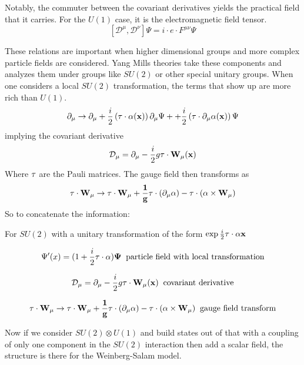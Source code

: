 Notably, the commuter between the covariant derivatives yields the practical field that it carries. For the $U(1) $ case, it is the electromagnetic field tensor. 
\[  \left[ \mathcal{D}^\mu,\mathcal{D}^\nu\right] \Psi = i\cdot e\cdot F^{\mu\nu} \Psi\]

These relations are important when higher dimensional groups and more complex particle fields are considered. Yang Mills theories take these components and analyzes them under groups like $SU(2)$ or other special unitary groups. When one considers a local $SU(2)$ transformation, the terms that show up are more rich than $U(1)$.  
\[\partial_\mu \rightarrow \partial_\mu +\frac{i}{2}\left(\bf{\tau}\cdot\bf{\alpha}(x)\right)\partial_\mu \Psi +  +\frac{i}{2}\left(\bf{\tau}\cdot\partial_\mu\bf{\alpha}(x)\right) \Psi  \]
implying the covariant derivative 
\[\mathcal{D}_\mu = \partial_\mu -\frac{i}{2} g \bf{\tau}\cdot \bf{W}_\mu(x)\]
Where $\bf{\tau}$ are the Pauli matrices.
The gauge field then transforms as 
\[\bf{\tau}\cdot\bf{W}_\mu \rightarrow  \bf{\tau}\cdot\bf{W}_\mu + \frac{1}{g}\bf{\tau}\cdot(\partial_\mu \bf{\alpha}) - \bf{\tau}\cdot (\bf{\alpha}\times\bf{W}_\mu) \]
So to concatenate the information: 

For $SU(2)$ with a unitary transformation of the form $\exp{\frac{i}{2}\bf{\tau}\cdot\alpha{x}}$ 

\[\Psi'(x)= (1 + \frac{i}{2}\bf{\tau}\cdot\bf{\alpha})\Psi \;\;\text{particle field with local transformation}\]

\[\mathcal{D}_\mu = \partial_\mu -\frac{i}{2} g \bf{\tau}\cdot \bf{W}_\mu(x) \;\;\text{covariant derivative}\]

\[\bf{\tau}\cdot\bf{W}_\mu \rightarrow  \bf{\tau}\cdot\bf{W}_\mu + \frac{1}{g}\bf{\tau}\cdot(\partial_\mu \bf{\alpha}) - \bf{\tau}\cdot (\bf{\alpha}\times\bf{W}_\mu) \;\;\text{gauge field transform} \]

Now if we consider $SU(2)\otimes U(1)$ and build states out of that with a coupling of only one component in the $SU(2)$ interaction then add a scalar field, the structure is there for the Weinberg-Salam model. 

